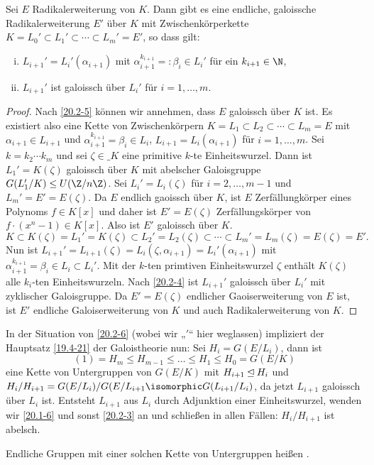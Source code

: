 \begin{st} \label{20.2-6}
	Sei $E$ Radikalerweiterung von $K$.
	Dann gibt es eine endliche, galoissche Radikalerweiterung $E'$ über $K$ mit Zwischenkörperkette $K = L_0' \subset L_1' \subset \dotsb \subset L_m' = E'$, so dass gilt:
	\begin{enumerate}[i)]
		\item
			$L_{i+1}' = L_i'(\alpha_{i+1})$ mit $\alpha_{i+1}^{k_{i+1}} =: \beta_i \in L_i'$ für ein $k_{i+1} \in \N$,
		\item
			$L_{i+1}'$ ist galoissch über $L_i'$ für $i = 1, \dotsc, m$.
	\end{enumerate}
	\begin{proof}
		Nach \ref{20.2-5} können wir annehmen, dass $E$ galoissch über $K$ ist.
		Es existiert also eine Kette von Zwischenkörpern $K = L_1 \subset L_2 \subset \dotsb \subset L_m = E$ mit $\alpha_{i+1} \in L_{i+1}$ und $\alpha_{i+1}^{k_{i+1}} = \beta_i \in L_i$, $L_{i+1} = L_i(\alpha_{i+1})$ für $i=1, \dotsc, m$.
		Sei $k = k_2 \dotsb k_m$ und sei $\zeta \in \_K$ eine primitive $k$-te Einheitswurzel.
		Dann ist $L_1' = K(\zeta)$ galoissch über $K$ mit abelscher Galoisgruppe $G(L_1' / K) \le U(\Z / n\Z)$.
		Sei $L_i' = L_i(\zeta)$ für $i = 2, \dotsc, m-1$ und $L_m' = E' = E(\zeta)$.
		Da $E$ endlich gaoissch über $K$, ist $E$ Zerfällungkörper eines Polynoms $f \in K[x]$ und daher ist $E' = E(\zeta)$ Zerfällungskörper von $f \cdot (x^n - 1) \in K[x]$.
		Also ist $E'$ galoissch über $K$.
		\[
			K \subset K(\zeta) = L_1' = K(\zeta) \subset L_2' = L_2(\zeta) \subset \dotsb \subset L_m' = L_m(\zeta) = E(\zeta) = E'.
		\]
		Nun ist $L_{i+1}' = L_{i+1}(\zeta) = L_i (\zeta, \alpha_{i+1}) = L_i'(\alpha_{i+1})$ mit $\alpha_{i+1}^{k_{i+1}} = \beta_i \in L_i \subset L_i'$.
		Mit der $k$-ten primtiven Einheitswurzel $\zeta$ enthält $K(\zeta)$ alle $k_i$-ten Einheitswurzeln.
		Nach \ref{20.2-4} ist $L_{i+1}'$ galoissch über $L_i'$ mit zyklischer Galoisgruppe.
		Da $E' = E(\zeta)$ endlicher Gaoiserweiterung von $E$ ist, ist $E'$ endliche Galoiserweiterung von $K$ und auch Radikalerweiterung von $K$.
	\end{proof}
\end{st}

\begin{nt} \label{20.2-7}
	In der Situation von \ref{20.2-6} (wobei wir „$'$“ hier weglassen) impliziert der Hauptsatz \ref{19.4-21} der Galoistheorie nun:
	Sei $H_i = G(E / L_i)$, dann ist
	\[
		(1) = H_m \le H_{m-1} \le \dotso \le H_1 \le H_0 = G(E / K)
	\]
	eine Kette von Untergruppen von $G(E / K)$ mit $H_{i+1} \mathbin{\trianglelefteq} H_i$ und $H_i / H_{i+1} = G(E / L_i) / G(E / L_{i+1} \isomorphic G(L_{i+1} / L_i)$, da jetzt $L_{i+1}$ galoissch über $L_i$ ist.
	Entsteht $L_{i+1}$ aus $L_i$ durch Adjunktion einer Einheitswurzel, wenden wir \ref{20.1-6} und sonst \ref{20.2-3} an und schließen in allen Fällen: $H_i / H_{i+1}$ ist abelsch.

	Endliche Gruppen mit einer solchen Kette von Untergruppen heißen .
\end{nt}

